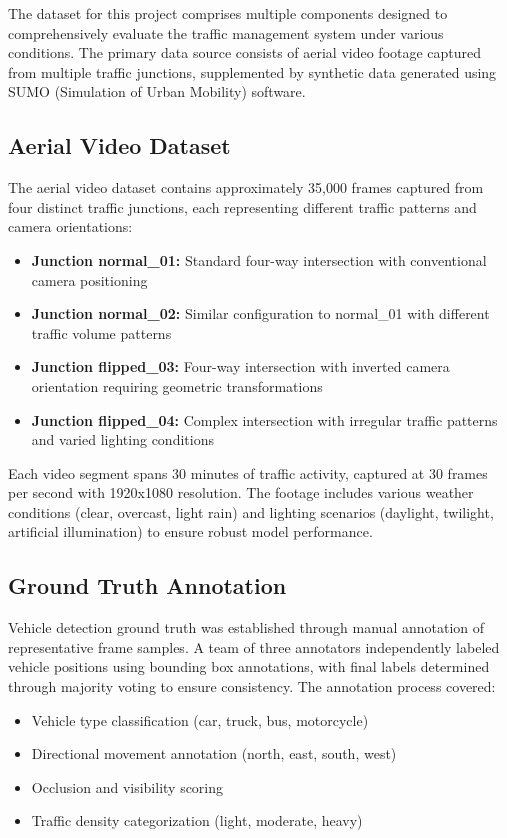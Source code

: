 \documentclass[conference]{IEEEtran}
\begin{document}
The dataset for this project comprises multiple components designed to comprehensively evaluate the traffic management system under various conditions. The primary data source consists of aerial video footage captured from multiple traffic junctions, supplemented by synthetic data generated using SUMO (Simulation of Urban Mobility) software\cite{sumo2023}.

\subsection{Aerial Video Dataset}

The aerial video dataset contains approximately 35,000 frames captured from four distinct traffic junctions, each representing different traffic patterns and camera orientations:

\begin{itemize}
\item \textbf{Junction normal\_01:} Standard four-way intersection with conventional camera positioning
\item \textbf{Junction normal\_02:} Similar configuration to normal\_01 with different traffic volume patterns
\item \textbf{Junction flipped\_03:} Four-way intersection with inverted camera orientation requiring geometric transformations
\item \textbf{Junction flipped\_04:} Complex intersection with irregular traffic patterns and varied lighting conditions
\end{itemize}

Each video segment spans 30 minutes of traffic activity, captured at 30 frames per second with 1920x1080 resolution. The footage includes various weather conditions (clear, overcast, light rain) and lighting scenarios (daylight, twilight, artificial illumination) to ensure robust model performance.

\subsection{Ground Truth Annotation}

Vehicle detection ground truth was established through manual annotation of representative frame samples. A team of three annotators independently labeled vehicle positions using bounding box annotations, with final labels determined through majority voting to ensure consistency. The annotation process covered:

\begin{itemize}
\item Vehicle type classification (car, truck, bus, motorcycle)
\item Directional movement annotation (north, east, south, west)
\item Occlusion and visibility scoring
\item Traffic density categorization (light, moderate, heavy)
\end{itemize}
\end{document}
